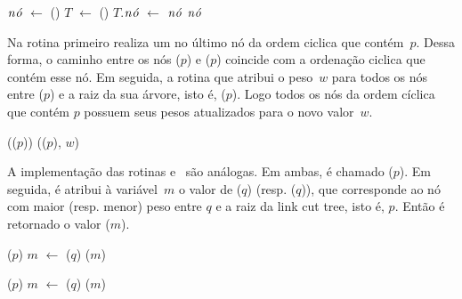 \begin{algorithm}[htb]
\caption{\LCOMakeNode($p$, $q$)}
\label{Algo:LCOMakeNode}
\begin{algorithmic}[1]
\State $\mathit{n\acute{o}}$ $\gets$ \linkcutCreate()
\State $T$ $\gets$ \treapCreate()
\State $T$.$\mathit{n\acute{o}}$ $\gets$ $\mathit{n\acute{o}}$
\State \Return $\mathit{n\acute{o}}$
\end{algorithmic}
\end{algorithm}

Na rotina \LCOAddCost{} primeiro realiza um \linkcutEvert{} no último nó da ordem ciclica que contém~$p$.
Dessa forma, o caminho entre os nós \treapFirst($p$) e \treapLast($p$) coincide com a ordenação ciclica que contém esse nó.
Em seguida, a rotina \linkcutWeight{} que atribui o peso~$w$ para todos os nós entre \treapFirst($p$) e a raiz da sua árvore, isto é, \treapLast($p$).
Logo todos os nós da ordem cíclica que contém $p$ possuem seus pesos atualizados para o novo valor~$w$.

\begin{algorithm}[htb]
\caption{\LCOAddCost($p$, $w$)}
\label{Algo:LCOAddCost}
\begin{algorithmic}[1]
\State \linkcutEvert(\treapLast($p$))
\State \linkcutWeight(\treapFirst($p$), $w$)
\end{algorithmic}
\end{algorithm}

A implementação das rotinas \LCOMax{} e~\LCOMin{} são análogas.
Em ambas, é chamado \linkcutEvert($p$).
Em seguida, é atribui à variável~$m$ o valor de \linkcutMax($q$) (resp. \linkcutMin($q$)), que corresponde ao nó com maior (resp. menor) peso entre $q$ e a raiz da link cut tree, isto é, $p$.
Então é retornado o valor \LCOFindNode($m$).

\begin{algorithm}[htb]
\caption{\LCOMax($p$, $q$)}
\label{Algo:LCOMax}
\begin{algorithmic}[1]
\State \linkcutEvert($p$)
\State $m$ $\gets$ \linkcutMax($q$)
\State \Return \LCOFindNode($m$)
\end{algorithmic}
\end{algorithm}

\begin{algorithm}[htb]
\caption{\LCOMin($p$, $q$)}
\label{Algo:LCOMin}
\begin{algorithmic}[1]
\State \linkcutEvert($p$)
\State $m$ $\gets$ \linkcutMin($q$)
\State \Return \LCOFindNode($m$)
\end{algorithmic}
\end{algorithm}

